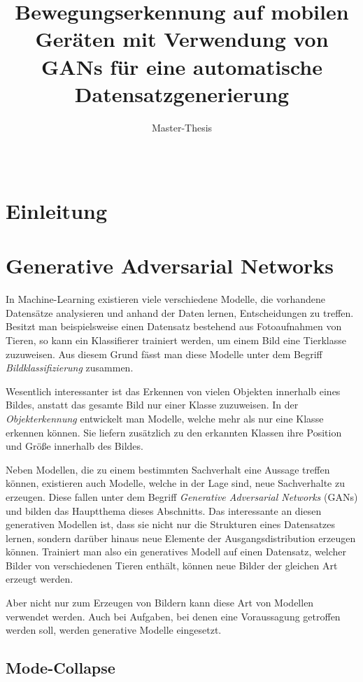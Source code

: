 \documentclass{hsflensburg}
\title{Bewegungserkennung auf mobilen Geräten mit Verwendung von GANs für eine automatische Datensatzgenerierung}
\subtitle{Master-Thesis}
\author{
  \name{Florian Hansen}\\
  \institution{Hochschule Flensburg}
}
\begin{document}
  \maketitle
  \tableofcontents

  \section{Einleitung}

  \section{Generative Adversarial Networks}
  In Machine-Learning existieren viele verschiedene Modelle, die vorhandene
  Datensätze analysieren und anhand der Daten lernen, Entscheidungen zu treffen.
  Besitzt man beispielsweise einen Datensatz bestehend aus Fotoaufnahmen von
  Tieren, so kann ein Klassifierer trainiert werden, um einem Bild eine
  Tierklasse zuzuweisen. Aus diesem Grund fässt man diese Modelle unter dem
  Begriff \textit{Bildklassifizierung} zusammen.

  Wesentlich interessanter ist das Erkennen von vielen Objekten innerhalb eines Bildes,
  anstatt das gesamte Bild nur einer Klasse zuzuweisen. In der \textit{Objekterkennung}
  entwickelt man Modelle, welche mehr als nur eine Klasse erkennen können. Sie liefern
  zusätzlich zu den erkannten Klassen ihre Position und Größe innerhalb des
  Bildes. 

  Neben Modellen, die zu einem bestimmten Sachverhalt eine Aussage treffen
  können, existieren auch Modelle, welche in der Lage sind, neue Sachverhalte zu
  erzeugen. Diese fallen unter dem Begriff \textit{Generative Adversarial
  Networks} (GANs) und bilden das Hauptthema dieses Abschnitts. Das interessante an
  diesen generativen Modellen ist, dass sie nicht nur die Strukturen eines
  Datensatzes lernen, sondern darüber hinaus neue Elemente der
  Ausgangsdistribution erzeugen können. Trainiert man also ein generatives
  Modell auf einen Datensatz, welcher Bilder von verschiedenen Tieren enthält,
  können neue Bilder der gleichen Art erzeugt werden.

  Aber nicht nur zum Erzeugen von Bildern kann diese Art von Modellen verwendet
  werden. Auch bei Aufgaben, bei denen eine Voraussagung getroffen werden soll,
  werden generative Modelle eingesetzt. 

  \subsection{Mode-Collapse}
\end{document}

